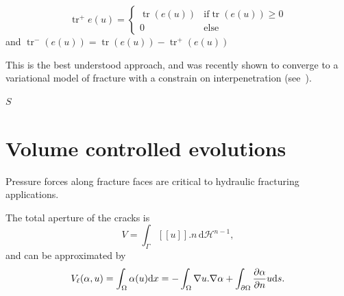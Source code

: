 \documentclass[10pt,oneside]{memoir}
\def\vDefP{{\texttt{vDefP}} }
\let\div\relax
\DeclareMathOperator*{\div}{div}
\DeclareMathOperator{\tr}{tr}
\newcommand{\jump}[1]{\ensuremath{[\![#1]\!]} }
\begin{document}
\begin{equation}
\tr^+ e(u) = \left\{
    \begin{array}{ll}
         \tr{(e(u))}  & \mbox{if}  \tr{(e(u))} \geq 0  \\
        0 & \mbox{else}
    \end{array}
\right.
\end{equation}
and $\tr ^-({e(u)}) = \tr({e(u)}) - \tr ^+({e(u)})$

This is the best understood approach, and was recently shown to converge to a variational model of fracture with a constrain on interpenetration (see~\cite{Chambolle-Conti-EtAl-2017a}).




$S$ 

\section{Volume controlled evolutions}

Pressure forces along fracture faces are critical to hydraulic fracturing applications.

The total aperture of the cracks is
$$ V = \int_{\Gamma} \jump{u} .n\, \mathrm{d}\mathcal{H}^{n-1},$$
and can be approximated by
$$ V_{\ell}(\alpha,u)=\int_{\Omega} \alpha \div{(u)} \mathrm{d}x= - \int_{\Omega} \nabla u . \nabla \alpha + \int_{\partial \Omega} \frac{\partial \alpha}{\partial n} u \mathrm{d}s.$$
\end{document}
